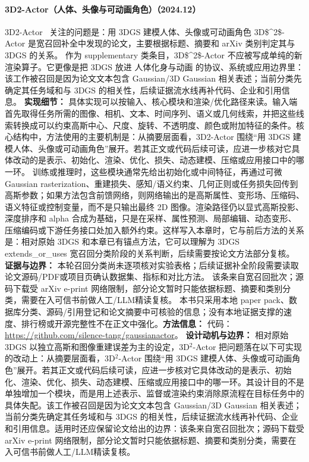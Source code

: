 \paragraph{3D2-Actor（人体、头像与可动画角色）（2024.12）}
3D2-Actor~\cite{2412_11599} 关注的问题是：用 3DGS 建模人体、头像或可动画角色 3D\$\textasciicircum{}2\$-Actor 是宽召回补全中发现的论文，主要根据标题、摘要和 arXiv 类别判定其与 3DGS 的关系。
作为 supplementary 类条目，3D\$\textasciicircum{}2\$-Actor 不应被写成单纯的新渲染算子。它更像是把 3DGS 放进 人体化身与动画 的协议、系统或应用边界里：该工作被召回是因为论文文本包含 Gaussian/3D Gaussian 相关表述；当前分类先确定其任务域和与 3DGS 的相关性，后续证据流水线再补代码、企业和引用信息。
\textbf{实现细节：} 具体实现可以按输入、核心模块和渲染/优化路径来读。输入端首先取得任务所需的图像、相机、文本、时间序列、语义或几何线索，并把这些线索转换成可以约束高斯中心、尺度、旋转、不透明度、颜色或附加特征的条件。核心结构中，方法使用的主要机制是：从摘要层面看，3D2-Actor 围绕“用 3DGS 建模人体、头像或可动画角色”展开。若其正文或代码后续可读，应进一步核对它具体改动的是表示、初始化、渲染、优化、损失、动态建模、压缩或应用接口中的哪一环。 训练或推理时，这些模块通常先给出初始化或中间特征，再通过可微 Gaussian rasterization、重建损失、感知/语义约束、几何正则或任务损失回传到高斯参数；如果方法包含前馈网络，则网络输出的是高斯属性、变形场、压缩码、语义特征或控制变量，而不是只输出最终 2D 图像。渲染路径仍以显式高斯投影、深度排序和 alpha 合成为基础，只是在采样、属性预测、局部编辑、动态变形、压缩编码或下游任务接口处加入额外约束。这样写入本章时，它与前后方法的关系是：相对原始 3DGS 和本章已有锚点方法，它可以理解为 3DGS extends\_or\_uses 宽召回分类阶段的关系判断，后续需要按论文方法部分复核。
\textbf{证据与边界：} 本轮召回分类尚未逐项核对实验表格；后续证据补全阶段需要读取论文源码/PDF或项目页确认数据集、指标和对比方法。 该条来自宽召回批次；源码下载受 arXiv e-print 网络限制，部分论文暂时只能依据标题、摘要和类别分类，需要在入可信书前做人工/LLM精读复核。 本书只采用本地 paper pack、数据库分类、源码/引用登记和论文摘要中可核验的信息；没有本地证据支撑的速度、排行榜或开源完整性不在正文中强化。\textbf{方法信息：} 代码：\url{https://github.com/silence-tang/gaussianactor}。
\textbf{设计动机与边界：} 相对原始 3DGS 以独立高斯和图像重建误差为主的设定，3D$^2$-Actor 把问题落在以下可实现的改动上：从摘要层面看，3D$^2$-Actor 围绕“用 3DGS 建模人体、头像或可动画角色”展开。若其正文或代码后续可读，应进一步核对它具体改动的是表示、初始化、渲染、优化、损失、动态建模、压缩或应用接口中的哪一环。其设计目的不是单独增加一个模块，而是用上述表示、监督或渲染约束消除原流程在目标任务中的具体失配。该工作被召回是因为论文文本包含 Gaussian/3D Gaussian 相关表述；当前分类先确定其任务域和与 3DGS 的相关性，后续证据流水线再补代码、企业和引用信息。适用时还应保留论文给出的边界：该条来自宽召回批次；源码下载受 arXiv e-print 网络限制，部分论文暂时只能依据标题、摘要和类别分类，需要在入可信书前做人工/LLM精读复核。

